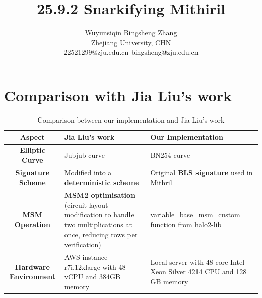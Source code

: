\documentclass{article}
\title{25.9.2 Snarkifying Mithiril}
\author{Wuyunsiqin \quad \quad Bingsheng Zhang \\ 
Zhejiang University, CHN \\
22521299@zju.edu.cn \quad bingsheng@zju.edu.cn}
\begin{document}
\maketitle

\section{Comparison with Jia Liu's work}

\begin{table}[htbp]
\centering
\caption{Comparison between our implementation and Jia Liu's work}
\label{tab:comparison}
\begin{tabular}{|c|p{5cm}|p{5cm}|}
\hline
\textbf{Aspect} & \textbf{Jia Liu's work} & \textbf{Our Implementation} \\
\hline
\textbf{Elliptic Curve} & Jubjub curve & BN254 curve \\
\hline
\textbf{Signature Scheme} & Modified into a \textbf{deterministic scheme}
 & Original \textbf{BLS signature} used in Mithril \\
\hline
\textbf{MSM Operation} & \textbf{MSM2 optimisation} (circuit layout modification to handle two multiplications at once, reducing rows per verification) & variable\_base\_msm\_custom function from halo2-lib \\
\hline
\textbf{Hardware Environment} & AWS instance r7i.12xlarge with 48 vCPU and 384GB memory 
 & Local server with 48-core Intel Xeon Silver 4214 CPU  and 128 GB memory\\
\hline
\end{tabular}
\end{table}
\end{document}
